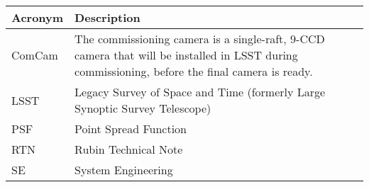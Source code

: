 \addtocounter{table}{-1}
\begin{longtable}{p{}p{}}\hline
\textbf{Acronym} & \textbf{Description}  \\\hline

ComCam & The commissioning camera is a single-raft, 9-CCD camera that will be installed in LSST during commissioning, before the final camera is ready. \\\hline
LSST & Legacy Survey of Space and Time (formerly Large Synoptic Survey Telescope) \\\hline
PSF & Point Spread Function \\\hline
RTN & Rubin Technical Note \\\hline
SE & System Engineering \\\hline
\end{longtable}
